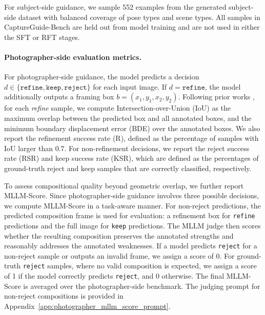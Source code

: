 \documentclass{article} %
\begin{document}
For subject-side guidance, we sample 552 examples from the generated subject-side dataset with balanced coverage of pose types and scene types. All samples in CaptureGuide-Bench are held out from model training and are not used in either the SFT or RFT stages.

\paragraph{Photographer-side evaluation metrics.}
For photographer-side guidance, the model predicts a decision $d \in \{\texttt{refine}, \texttt{keep}, \texttt{reject}\}$ for each input image. If $d=\texttt{refine}$, the model additionally outputs a framing box $b=(x_1,y_1,x_2,y_2)$. Following prior works \citep{fang2014automatic,zhang2022human}, for each \textit{refine} sample, we compute Intersection-over-Union (IoU) as the maximum overlap between the predicted box and all annotated boxes, and the minimum boundary displacement error (BDE) over the annotated boxes. We also report the refinement success rate (R), defined as the percentage of samples with IoU larger than 0.7. 
For non-refinement decisions, we report the reject success rate (RSR) and keep success rate (KSR), which are defined as the percentages of ground-truth reject and keep samples that are correctly classified, respectively.

To assess compositional quality beyond geometric overlap, we further report MLLM-Score. Since
photographer-side guidance involves three possible decisions, we compute MLLM-Score in a
task-aware manner. For non-reject predictions, the predicted composition frame is used for evaluation:
a refinement box for \texttt{refine} predictions and the full image for \texttt{keep}
predictions. The MLLM judge then scores whether the resulting composition preserves the annotated
strengths and reasonably addresses the annotated weaknesses. If a model predicts \texttt{reject} for
a non-reject sample or outputs an invalid frame, we assign a score of 0. For ground-truth
\texttt{reject} samples, where no valid composition is expected, we assign a score of 1 if the model correctly predicts \texttt{reject}, and 0 otherwise. The final
MLLM-Score is averaged over the photographer-side benchmark. The judging prompt for non-reject compositions is provided in Appendix~\ref{app:photographer_mllm_score_prompt}.
\end{document}
